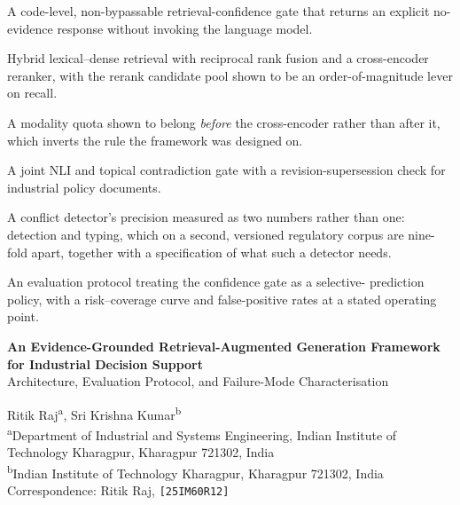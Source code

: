 \documentclass[preprint,3p,times]{elsarticle}
\begin{document}
\begin{highlights}
\item A code-level, non-bypassable retrieval-confidence gate that returns an
explicit no-evidence response without invoking the language model.
\item Hybrid lexical--dense retrieval with reciprocal rank fusion and a
cross-encoder reranker, with the rerank candidate pool shown to be an
order-of-magnitude lever on recall.
\item A modality quota shown to belong \emph{before} the cross-encoder
rather than after it, which inverts the rule the framework was designed
on.
\item A joint NLI and topical contradiction gate with a revision-supersession
check for industrial policy documents.
\item A conflict detector's precision measured as two numbers rather than one:
detection and typing, which on a second, versioned regulatory corpus are
nine-fold apart, together with a specification of what such a detector needs.
\item An evaluation protocol treating the confidence gate as a selective-
prediction policy, with a risk--coverage curve and false-positive rates at a
stated operating point.
\end{highlights}

\begin{center}
{\Large \bfseries An Evidence-Grounded Retrieval-Augmented Generation
Framework for Industrial Decision Support}\\[0.4em]
{\large Architecture, Evaluation Protocol, and Failure-Mode Characterisation}
\end{center}

\begin{center}
Ritik Raj\textsuperscript{a}, Sri Krishna Kumar\textsuperscript{b}\\[0.3em]
\small
\textsuperscript{a}Department of Industrial and Systems Engineering,
Indian Institute of Technology Kharagpur, Kharagpur 721302, India\\
\textsuperscript{b}Indian Institute of Technology Kharagpur, Kharagpur 721302, India\\
\small Correspondence: Ritik Raj, \texttt{[25IM60R12]}
\end{center}
\end{document}
